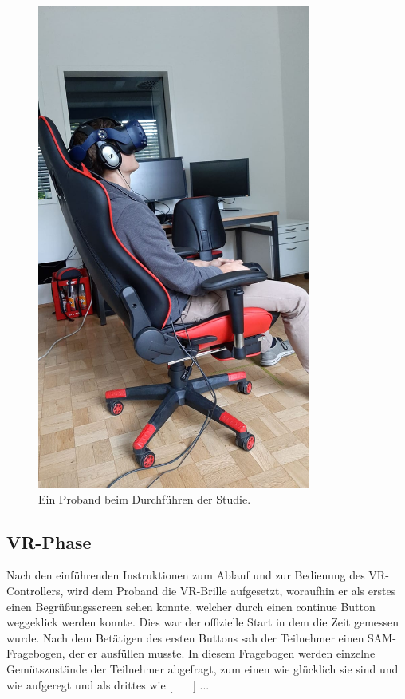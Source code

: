 \begin{figure}[H]
	\centering
	\includegraphics[width=0.8\textwidth]{./images/studie_awf.jpeg}
	\caption{Ein Proband beim Durchführen der Studie.}
	\label{fig:counting}
\end{figure}


\subsection{VR-Phase}
Nach den einführenden Instruktionen zum Ablauf und zur Bedienung des VR-Controllers, wird dem Proband die VR-Brille aufgesetzt, woraufhin er als erstes einen Begrüßungsscreen sehen konnte, welcher durch einen continue Button weggeklick werden konnte. Dies war der offizielle Start in dem die Zeit gemessen wurde. Nach dem Betätigen des ersten Buttons sah der Teilnehmer einen SAM-Fragebogen, der er ausfüllen musste. In diesem Fragebogen werden einzelne Gemütszustände der Teilnehmer abgefragt, zum einen wie glücklich sie sind und wie aufgeregt und als drittes wie [ \ \ \ ] ... 

